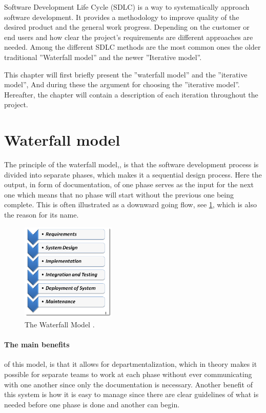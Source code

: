 Software Development Life Cycle (SDLC) is a way to systematically approach software development.
It provides a methodology to improve quality of the desired product and the general work progress. 
Depending on the customer or end users and how clear the project's requirements are different approaches are needed. 
Among the different SDLC methods are the most common ones the older traditional ''Waterfall model'' and the newer ''Iterative model''. \cite{SDLC-Toolsqa}

This chapter will first briefly present the ''waterfall model'' and the ''iterative model'', And during these the argument for choosing the ''iterative model''.
Hereafter, the chapter will contain a description of each iteration throughout the project.


\section{Waterfall model}
The principle of the waterfall model,\cite{Waterfall-Toolsqa}, is that the software development process is divided into separate phases, which makes it a sequential design process.
Here the output, in form of documentation, of one phase serves as the input for the next one which means that no phase will start without the previous one being complete.
This is often illustrated as a downward going flow, see \cref{fig:Waterfall}, which is also the reason for its name.

\begin{figure}[H]
	\centering
	\includegraphics[width=0.4\textwidth]{billeder/WaterFall-Model.png}
	\caption{The Waterfall Model \cite{Waterfall-Toolsqa}.}\label{fig:Waterfall}
\end{figure}

\paragraph{The main benefits} of this model, is that it allows for departmentalization, which in theory makes it possible for separate teams to work at each phase without ever communicating with one another since only the documentation is necessary.
Another benefit of this system is how it is easy to manage since there are clear guidelines of what is needed before one phase is done and another can begin.

